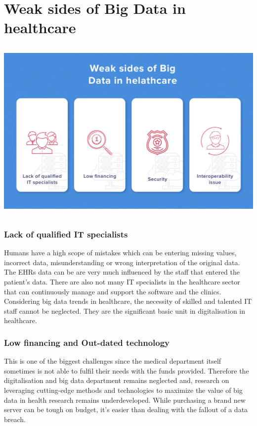 \documentclass[10pt,a4paper,twoside]{article}
\begin{document}
\section*{Weak sides of Big Data in healthcare} 

\begin{center}
    \includegraphics[width=14cm, height=9cm]{weak-sides} \\[\baselineskip]
\end{center}


\subsubsection*{Lack of qualified IT specialists }
Humans have a high scope of mistakes which can be entering missing values, incorrect data, misunderstanding or wrong interpretation of the original data. The EHRs data can be are very much influenced by the staff that entered the patient’s data. There are also not many IT specialists in the healthcare sector that can continuously manage and support the software and the clinics. Considering big data trends in healthcare, the necessity of skilled and talented IT staff cannot be neglected. They are the significant basic unit in digitalisation in healthcare.   


\subsubsection*{Low financing and Out-dated technology }
This is one of the biggest challenges since the medical department itself sometimes is not able to fulfil their needs with the funds provided. Therefore the digitalisation and big data department remains neglected and, research on leveraging cutting-edge methods and technologies to maximize the value of big data in health research remains underdeveloped. While purchasing a brand new server can be tough on budget, it’s easier than dealing with the fallout of a data breach.
\end{document}
